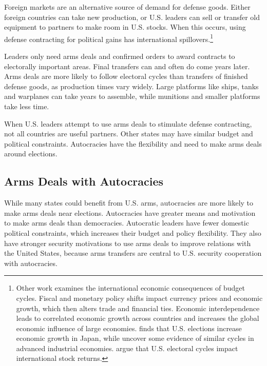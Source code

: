 \documentclass[12pt]{article}
\begin{document}
Foreign markets are an alternative source of demand for defense goods.
Either foreign countries can take new production, or U.S. leaders can sell or transfer old equipment to partners to make room in U.S. stocks. 
When this occurs, using defense contracting for political gains has international spillovers.\footnote{%
Other work examines the international economic consequences of budget cycles.
Fiscal and monetary policy shifts impact currency prices and economic growth, which then alters trade and financial ties. 
Economic interdependence leads to correlated economic growth across countries \citep{ArtisZhang1999, Kayser2006} and increases the global economic influence of large economies. 
\citet{Ito1991} finds that U.S. elections increase economic growth in Japan, while \citet{ThompsonZuk1983} uncover some evidence of similar cycles in advanced industrial economies.
\citet{FoersterSchmitz1997} argue that U.S. electoral cycles impact international stock returns.
}


Leaders only need arms deals and confirmed orders to award contracts to electorally important areas.
Final transfers can and often do come years later. 
Arms deals are more likely to follow electoral cycles than transfers of finished defense goods, as production times vary widely. 
Large platforms like ships, tanks and warplanes can take years to assemble, while munitions and smaller platforms take less time. 


When U.S. leaders attempt to use arms deals to stimulate defense contracting, not all countries are useful partners. 
Other states may have similar budget and political constraints. 
Autocracies have the flexibility and need to make arms deals around elections. 



\subsection{Arms Deals with Autocracies}


While many states could benefit from U.S. arms, autocracies are more likely to make arms deals near elections. 
Autocracies have greater means and motivation to make arms deals than democracies.
Autocratic leaders have fewer domestic political constraints, which increases their budget and policy flexibility. 
They also have stronger security motivations to use arms deals to improve relations with the United States, because arms transfers are central to U.S. security cooperation with autocracies.
\end{document}
